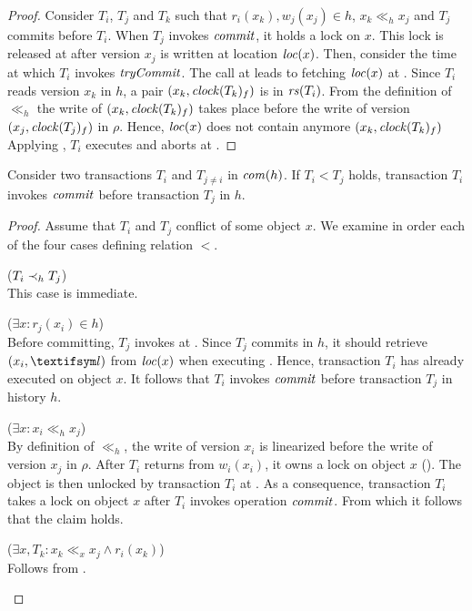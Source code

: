 \begin{proof}
  Consider $T_i$, $T_j$ and $T_k$ such that $r_i(x_k), w_j(x_j) \in h$, $x_k \ll_h x_j$ and $T_j$ commits before $T_i$.
  When $T_j$ invokes $\stmCommitFunction$, it holds a lock on $x$.
  This lock is released at  after version $x_j$ is written at location $\locationOf{x}$.
  Then, consider the time at which $T_i$ invokes $\stmTryCommitFunction$.
  The call at  leads to fetching $\locationOf{x}$ at .
  Since $T_i$ reads version $x_k$ in $h$, a pair $(x_k,\clockOf{T_k}_f)$ is in $\readSetOf{T_i}$.
  From the definition of $\ll_h$ the write of $(x_k,\clockOf{T_k}_f)$ takes place before the write of version $(x_j,\clockOf{T_j}_f)$ in $\rho$.
  Hence, $\locationOf{x}$ does not contain anymore $(x_k,\clockOf{T_k}_f)$
  Applying , $T_i$ executes  and aborts at .
\end{proof}

\begin{proposition}
  Consider two transactions $T_i$ and $T_{j \neq i}$ in $\committed{h}$.
  If $T_i < T_j$ holds, transaction $T_i$ invokes $\stmCommitFunction$ before transaction $T_j$ in $h$.
\end{proposition}

\begin{proof}
  Assume that $T_i$ and $T_j$ conflict of some object $x$.
  We examine in order each of the four cases defining relation $<$.
  \begin{compactitem}
  \item ($T_i \hb_h T_j$)\\
    This case is immediate.
  \item ($\exists x : r_j(x_i) \in h$)\\
    Before committing, $T_j$ invokes \stmExtendFunction at .
    Since $T_j$ commits in $h$, it should retrieve $(x_i,\msgAny)$ from $\locationOf{x}$ when executing .
    Hence, transaction $T_i$ has already executed  on object $x$.
    It follows that $T_i$ invokes $\stmCommitFunction$ before transaction $T_j$ in history $h$.
  \item ($\exists x : x_i \ll_h x_j$)\\
    By definition of $\ll_h$, the write of version $x_i$ is linearized before the write of version $x_j$ in $\rho$.
    After $T_i$ returns from $w_i(x_i)$, it owns a lock on object $x$ ().
    The object is then unlocked by transaction $T_i$ at .
    As a consequence, transaction $T_i$ takes a lock on object $x$ after $T_i$ invokes operation $\stmCommitFunction$.
    From which it follows that the claim holds.
  \item ($\exists x, T_k : x_k \ll_x x_j \land r_i(x_k)$)\\
    Follows from .
  \end{compactitem}
  
\end{proof}

